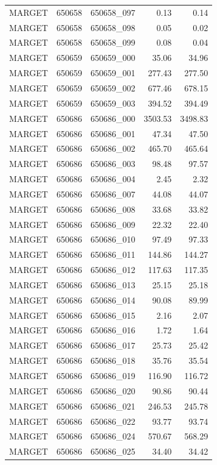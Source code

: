 \begin{tabular}{lllrr}
MARGET & 650658 & 650658_097 & 0.13 & 0.14 \\
MARGET & 650658 & 650658_098 & 0.05 & 0.02 \\
MARGET & 650658 & 650658_099 & 0.08 & 0.04 \\
MARGET & 650659 & 650659_000 & 35.06 & 34.96 \\
MARGET & 650659 & 650659_001 & 277.43 & 277.50 \\
MARGET & 650659 & 650659_002 & 677.46 & 678.15 \\
MARGET & 650659 & 650659_003 & 394.52 & 394.49 \\
MARGET & 650686 & 650686_000 & 3503.53 & 3498.83 \\
MARGET & 650686 & 650686_001 & 47.34 & 47.50 \\
MARGET & 650686 & 650686_002 & 465.70 & 465.64 \\
MARGET & 650686 & 650686_003 & 98.48 & 97.57 \\
MARGET & 650686 & 650686_004 & 2.45 & 2.32 \\
MARGET & 650686 & 650686_007 & 44.08 & 44.07 \\
MARGET & 650686 & 650686_008 & 33.68 & 33.82 \\
MARGET & 650686 & 650686_009 & 22.32 & 22.40 \\
MARGET & 650686 & 650686_010 & 97.49 & 97.33 \\
MARGET & 650686 & 650686_011 & 144.86 & 144.27 \\
MARGET & 650686 & 650686_012 & 117.63 & 117.35 \\
MARGET & 650686 & 650686_013 & 25.15 & 25.18 \\
MARGET & 650686 & 650686_014 & 90.08 & 89.99 \\
MARGET & 650686 & 650686_015 & 2.16 & 2.07 \\
MARGET & 650686 & 650686_016 & 1.72 & 1.64 \\
MARGET & 650686 & 650686_017 & 25.73 & 25.42 \\
MARGET & 650686 & 650686_018 & 35.76 & 35.54 \\
MARGET & 650686 & 650686_019 & 116.90 & 116.72 \\
MARGET & 650686 & 650686_020 & 90.86 & 90.44 \\
MARGET & 650686 & 650686_021 & 246.53 & 245.78 \\
MARGET & 650686 & 650686_022 & 93.77 & 93.74 \\
MARGET & 650686 & 650686_024 & 570.67 & 568.29 \\
MARGET & 650686 & 650686_025 & 34.40 & 34.42 \\

\end{tabular}
